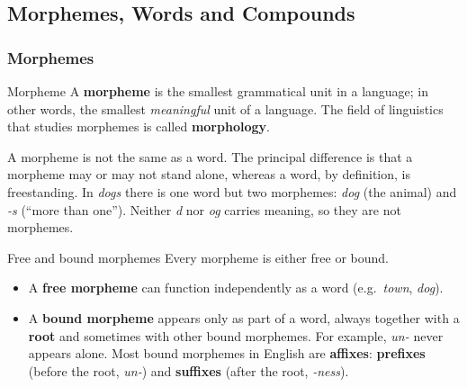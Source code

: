 \subsection{Morphemes, Words and Compounds}
\label{sec:morphology}

\subsubsection{Morphemes}

\begin{nbdef}{Morpheme}
A \textbf{morpheme} is the smallest grammatical unit in a language; in other words, the
smallest \emph{meaningful} unit of a language. The field of linguistics that studies
morphemes is called \textbf{morphology}.
\end{nbdef}

A morpheme is not the same as a word. The principal difference is that a morpheme may
or may not stand alone, whereas a word, by definition, is freestanding. In
\emph{dogs} there is one word but two morphemes: \emph{dog} (the animal) and \emph{-s}
(``more than one''). Neither \emph{d} nor \emph{og} carries meaning, so they are not
morphemes.

\begin{nbdef}{Free and bound morphemes}
Every morpheme is either free or bound.
\begin{itemize}[nosep]
  \item A \textbf{free morpheme} can function independently as a word (e.g.\
        \emph{town}, \emph{dog}).
  \item A \textbf{bound morpheme} appears only as part of a word, always together with a
        \textbf{root} and sometimes with other bound morphemes. For example,
        \emph{un-} never appears alone. Most bound morphemes in English are
        \textbf{affixes}: \textbf{prefixes} (before the root, \emph{un-}) and
        \textbf{suffixes} (after the root, \emph{-ness}).
\end{itemize}
\end{nbdef}

